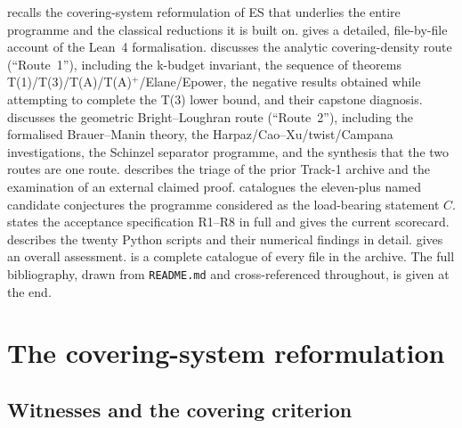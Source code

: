\documentclass[11pt]{article}
\theoremstyle{plain}
\theoremstyle{definition}
\theoremstyle{remark}
\newcommand{\file}[1]{\texttt{#1}}
\renewcommand{\_}{\textunderscore\allowbreak}
\begin{document}
 recalls the covering-system reformulation of ES that underlies the entire
programme and the classical reductions it is built on.  gives a detailed,
file-by-file account of the Lean~4 formalisation.  discusses the analytic
covering-density route (``Route~1''), including the k-budget invariant, the sequence of
theorems T(1)/T(3)/T(A)/T(A)$^+$/E\_lane/E\_power, the negative results obtained while
attempting to complete the T(3) lower bound, and their capstone diagnosis. 
discusses the geometric Bright--Loughran route (``Route~2''), including the formalised
Brauer--Manin theory, the Harpaz/Cao--Xu/twist/Campana investigations, the Schinzel separator
programme, and the synthesis that the two routes are one route.  describes the
triage of the prior Track-1 archive and the examination of an external claimed proof.
 catalogues the eleven-plus named candidate conjectures the programme
considered as the load-bearing statement $C$.  states the acceptance
specification R1--R8 in full and gives the current scorecard.  describes
the twenty Python scripts and their numerical findings in detail.  gives an
overall assessment.  is a complete catalogue of every file in the archive. The
full bibliography, drawn from \file{README.md} and cross-referenced throughout, is given at the
end.


\section{The covering-system reformulation}
\label{sec:covering}

\subsection{Witnesses and the covering criterion}
\end{document}
